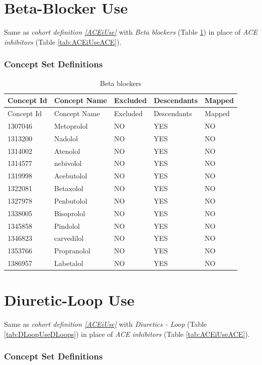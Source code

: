 \documentclass[10.5pt]{book}
\theoremstyle{definition}
\theoremstyle{definition}
\theoremstyle{definition}
\theoremstyle{remark}
\begin{document}
\section{Beta-Blocker Use}\label{BBUse}

Same as \emph{cohort definition \ref{ACEiUse}} with \emph{Beta blockers}
(Table \ref{tab:BBUseBB}) in place of \emph{ACE inhibitors} (Table
\ref{tab:ACEiUseACE}).

\subsubsection*{Concept Set
Definitions}\label{concept-set-definitions-11}

\begin{longtable}[]{@{}lllll@{}}
\caption{\label{tab:BBUseBB} Beta blockers}\tabularnewline
\toprule
Concept Id & Concept Name & Excluded & Descendants &
Mapped\tabularnewline
\midrule
\endfirsthead
\toprule
Concept Id & Concept Name & Excluded & Descendants &
Mapped\tabularnewline
\midrule
\endhead
1307046 & Metoprolol & NO & YES & NO\tabularnewline
1313200 & Nadolol & NO & YES & NO\tabularnewline
1314002 & Atenolol & NO & YES & NO\tabularnewline
1314577 & nebivolol & NO & YES & NO\tabularnewline
1319998 & Acebutolol & NO & YES & NO\tabularnewline
1322081 & Betaxolol & NO & YES & NO\tabularnewline
1327978 & Penbutolol & NO & YES & NO\tabularnewline
1338005 & Bisoprolol & NO & YES & NO\tabularnewline
1345858 & Pindolol & NO & YES & NO\tabularnewline
1346823 & carvedilol & NO & YES & NO\tabularnewline
1353766 & Propranolol & NO & YES & NO\tabularnewline
1386957 & Labetalol & NO & YES & NO\tabularnewline
\bottomrule
\end{longtable}

\section{Diuretic-Loop Use}\label{DLoopUse}

Same as \emph{cohort definition \ref{ACEiUse}} with \emph{Diuretics -
Loop} (Table \ref{tab:DLoopUseDLoops}) in place of \emph{ACE inhibitors}
(Table \ref{tab:ACEiUseACE}).

\subsubsection*{Concept Set
Definitions}\label{concept-set-definitions-12}
\end{document}
